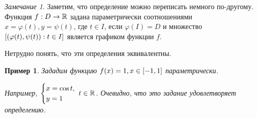 \documentclass[a5paper, 10pt]{article}
\theoremstyle{definition}
\theoremstyle{plain}
\newtheorem{Ex}{Пример}
\theoremstyle{remark}
\newtheorem*{Note}{Замечание}
\begin{document}
	\begin{Note}
		Заметим, что определение можно переписать немного по-другому.
		Функция $f: D \rightarrow \mathbb{R}$ задана параметрически соотношениями $x = \varphi(t), y = \psi(t)$, где $t\in I$, если $\varphi(I) = D$ и множество $\left[\left(\varphi(t), \psi(t)\right) : t \in I\right]$ является графиком функции $f$.
		
		Нетрудно понять, что эти определения эквивалентны.
	\end{Note}

	\begin{Ex}
		Зададим функцию $f(x) = 1, x\in\left[-1,1\right]$ параметрически.
		
		Например, $\case{x =\cos t,\\ y=1} \; t\in \R$. Очевидно, что это задание удовлетворяет определению.
	\end{Ex}
\end{document}
